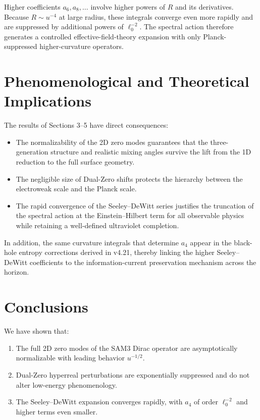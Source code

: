 \documentclass[11pt,a4paper]{article}
\begin{document}
Higher coefficients \(a_6,a_8,\ldots\) involve higher powers of \(R\) and its derivatives. Because \(R\sim u^{-4}\) at large radius, these integrals converge even more rapidly and are suppressed by additional powers of \(\ell_0^{-2}\). The spectral action therefore generates a controlled effective-field-theory expansion with only Planck-suppressed higher-curvature operators.

\section{Phenomenological and Theoretical Implications}

The results of Sections 3–5 have direct consequences:
\begin{itemize}
\item The normalizability of the 2D zero modes guarantees that the three-generation structure and realistic mixing angles survive the lift from the 1D reduction to the full surface geometry.
\item The negligible size of Dual-Zero shifts protects the hierarchy between the electroweak scale and the Planck scale.
\item The rapid convergence of the Seeley–DeWitt series justifies the truncation of the spectral action at the Einstein–Hilbert term for all observable physics while retaining a well-defined ultraviolet completion.
\end{itemize}

In addition, the same curvature integrals that determine \(a_4\) appear in the black-hole entropy corrections derived in v4.21, thereby linking the higher Seeley–DeWitt coefficients to the information-current preservation mechanism across the horizon.

\section{Conclusions}

We have shown that:
\begin{enumerate}[label=(\roman*)]
\item The full 2D zero modes of the SAM3 Dirac operator are asymptotically normalizable with leading behavior \(u^{-1/2}\).
\item Dual-Zero hyperreal perturbations are exponentially suppressed and do not alter low-energy phenomenology.
\item The Seeley–DeWitt expansion converges rapidly, with \(a_4\) of order \(\ell_0^{-2}\) and higher terms even smaller.
\end{enumerate}
\end{document}
